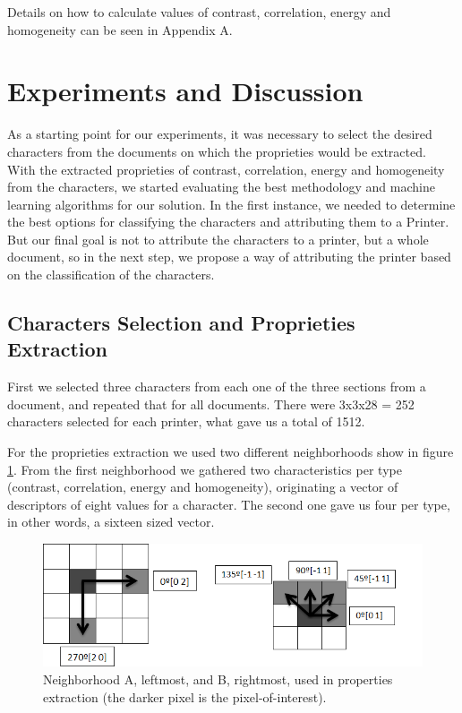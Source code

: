 \documentclass[10pt,twocolumn,letterpaper]{article}
\begin{document}
Details on how to calculate values of contrast, correlation, energy and homogeneity can be seen in Appendix A.

\section{Experiments and Discussion}
\label{sec:experiments}

As a starting point for our experiments, it was necessary to select the desired characters from the documents on which the proprieties would be extracted. With the extracted proprieties of contrast, correlation, energy and homogeneity from the characters, we started evaluating the best methodology and machine learning algorithms for our solution. In the first instance, we needed to determine the best options for classifying the characters and attributing them to a Printer. But our final goal is not to attribute the characters to a printer, but a whole document, so in the next step, we propose a way of attributing the printer based on the classification of the characters.

\subsection{Characters Selection and Proprieties Extraction}

First we selected three characters from each one of the three sections from a document, and repeated that for all documents. There were 3x3x28 = 252 characters selected for each printer, what gave us a total of 1512.

For the proprieties extraction we used two different neighborhoods show in figure \ref{fig:neighbor}. From the first neighborhood we gathered two characteristics per type (contrast, correlation, energy and homogeneity), originating a vector of descriptors of eight values for a character. The second one gave us four per type, in other words, a sixteen sized vector.

\begin{figure}
\begin{center}
	\includegraphics[width=0.99\columnwidth]{neighbor}
	\caption{Neighborhood A, leftmost, and B, rightmost, used in properties extraction (the darker pixel is the pixel-of-interest).}
\label{fig:neighbor}   
\end{center} 
\end{figure}
\end{document}
